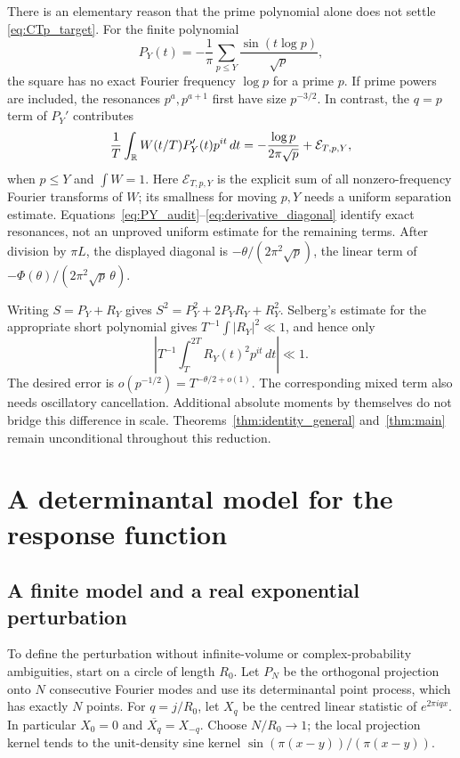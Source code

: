 \documentclass[11pt,reqno]{amsart}
\theoremstyle{plain}\newtheorem{theorem}{Theorem}[section]\newtheorem{proposition}[theorem]{Proposition}\newtheorem{lemma}[theorem]{Lemma}\newtheorem{corollary}[theorem]{Corollary}
\theoremstyle{definition}\newtheorem{hypothesis}[theorem]{Hypothesis}\newtheorem{definition}[theorem]{Definition}
\theoremstyle{remark}\newtheorem{remark}[theorem]{Remark}\newtheorem{experiment}[theorem]{Experiment}\newtheorem{question}[theorem]{Question}\newtheorem{heuristic}[theorem]{Heuristic}\newtheorem{conjecture}[theorem]{Conjecture}
\begin{document}
There is an elementary reason that the prime polynomial alone does not settle \eqref{eq:CTp_target}. For the finite polynomial
\begin{equation}
 P_Y(t)=-\frac1\pi\sum_{p\le Y}\frac{\sin(t\log p)}{\sqrt p},
 \label{eq:PY_audit}
\end{equation}
the square has no exact Fourier frequency $\log p$ for a prime $p$. If prime powers are included, the resonances $p^a,p^{a+1}$ first have size $p^{-3/2}$. In contrast, the $q=p$ term of $P_Y'$ contributes
\begin{equation}
 \frac1T\int_\mathbb R W(t/T)P_Y'(t)p^{it}\,dt
       =-\frac{\log p}{2\pi\sqrt p}+\mathcal E_{T,p,Y},
 \label{eq:derivative_diagonal}
\end{equation}
when $p\le Y$ and $\int W=1$. Here $\mathcal E_{T,p,Y}$ is the explicit sum of all nonzero-frequency Fourier transforms of $W$; its smallness for moving $p,Y$ needs a uniform separation estimate. Equations~\eqref{eq:PY_audit}--\eqref{eq:derivative_diagonal} identify exact resonances, not an unproved uniform estimate for the remaining terms. After division by $\pi L$, the displayed diagonal is $-\theta/(2\pi^2\sqrt p)$, the linear term of $-\Phi(\theta)/(2\pi^2\sqrt p\,\theta)$.

Writing $S=P_Y+R_Y$ gives $S^2=P_Y^2+2P_YR_Y+R_Y^2$. Selberg's estimate for the appropriate short polynomial gives $T^{-1}\int|R_Y|^2\ll1$, and hence only
\begin{equation}
 \left|T^{-1}\int_T^{2T}R_Y(t)^2p^{it}\,dt\right|\ll1.
 \label{eq:Selberg_scale_gap}
\end{equation}
The desired error is $o(p^{-1/2})=T^{-\theta/2+o(1)}$. The corresponding mixed term also needs oscillatory cancellation. Additional absolute moments by themselves do not bridge this difference in scale. Theorems~\ref{thm:identity_general} and~\ref{thm:main} remain unconditional throughout this reduction.

\section{A determinantal model for the response function}
\label{sec:sine_response}
\subsection{A finite model and a real exponential perturbation}
\label{subsec:tilt_definition}
To define the perturbation without infinite-volume or complex-probability ambiguities, start on a circle of length $R_0$. Let $P_N$ be the orthogonal projection onto $N$ consecutive Fourier modes and use its determinantal point process, which has exactly $N$ points. For $q=j/R_0$, let $X_q$ be the centred linear statistic of $e^{2\pi iqx}$. In particular $X_0=0$ and $\overline{X_q}=X_{-q}$. Choose $N/R_0\to1$; the local projection kernel tends to the unit-density sine kernel $\sin(\pi(x-y))/(\pi(x-y))$.
\end{document}
